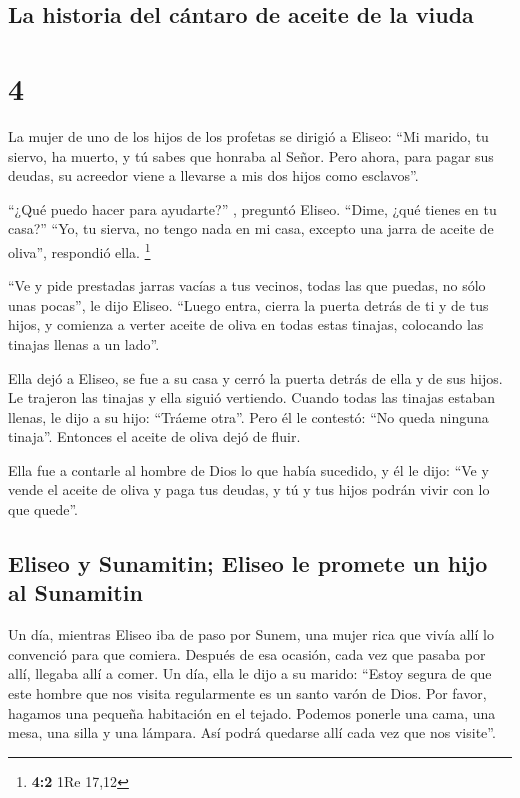 \hypertarget{la-historia-del-cuxe1ntaro-de-aceite-de-la-viuda}{%
\subsection{La historia del cántaro de aceite de la
viuda}\label{la-historia-del-cuxe1ntaro-de-aceite-de-la-viuda}}

\hypertarget{section-3}{%
\section{4}\label{section-3}}

 La mujer de uno de los hijos de los profetas se dirigió a
Eliseo: ``Mi marido, tu siervo, ha muerto, y tú sabes que honraba al
Señor. Pero ahora, para pagar sus deudas, su acreedor viene a llevarse a
mis dos hijos como esclavos''.

 ``¿Qué puedo hacer para ayudarte?'' , preguntó Eliseo.
``Dime, ¿qué tienes en tu casa?'' ``Yo, tu sierva, no tengo nada en mi
casa, excepto una jarra de aceite de oliva'', respondió ella.
\footnote{\textbf{4:2} 1Re 17,12}

 ``Ve y pide prestadas jarras vacías a tus vecinos, todas
las que puedas, no sólo unas pocas'', le dijo Eliseo. 
``Luego entra, cierra la puerta detrás de ti y de tus hijos, y comienza
a verter aceite de oliva en todas estas tinajas, colocando las tinajas
llenas a un lado''.

 Ella dejó a Eliseo, se fue a su casa y cerró la puerta
detrás de ella y de sus hijos. Le trajeron las tinajas y ella siguió
vertiendo.  Cuando todas las tinajas estaban llenas, le
dijo a su hijo: ``Tráeme otra''. Pero él le contestó: ``No queda ninguna
tinaja''. Entonces el aceite de oliva dejó de fluir.

 Ella fue a contarle al hombre de Dios lo que había
sucedido, y él le dijo: ``Ve y vende el aceite de oliva y paga tus
deudas, y tú y tus hijos podrán vivir con lo que quede''.

\hypertarget{eliseo-y-sunamitin-eliseo-le-promete-un-hijo-al-sunamitin}{%
\subsection{Eliseo y Sunamitin; Eliseo le promete un hijo al
Sunamitin}\label{eliseo-y-sunamitin-eliseo-le-promete-un-hijo-al-sunamitin}}

 Un día, mientras Eliseo iba de paso por Sunem, una mujer
rica que vivía allí lo convenció para que comiera. Después de esa
ocasión, cada vez que pasaba por allí, llegaba allí a comer.
 Un día, ella le dijo a su marido: ``Estoy segura de que
este hombre que nos visita regularmente es un santo varón de Dios.
 Por favor, hagamos una pequeña habitación en el tejado.
Podemos ponerle una cama, una mesa, una silla y una lámpara. Así podrá
quedarse allí cada vez que nos visite''.

